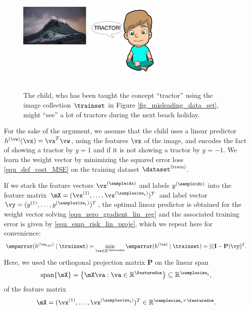 \documentclass[12pt]{report}
\begin{document}
\begin{figure}[htbp]
	\centering
	\includegraphics[width=0.7\textwidth]{OverfittingSample.jpg}   
	\caption{The child, who has been taught the concept ``tractor'' using the image collection 
		$\trainset$ in Figure \ref{fig_misleading_data_set}, might ``see'' a lot of tractors during the next beach holiday.}
	\label{equ_wave_as_tractor}   
\end{figure}


For the sake of the argument, we assume that the child uses a linear predictor 
$h^{(\vw)}(\vx) = \vx^{T} \vw$, using the features $\vx$ of the image, and encodes 
the fact of showing a tractor by $y=1$ and if it is not showing a tractor by $y=-1$. 
We learn the weight vector by minimizing the squared error loss \eqref{equ_def_cost_MSE} 
on the training dataset $\dataset^{(\rm train)}$.

If we stack the feature vectors $\vx^{(\sampleidx)}$ and labels $y^{(\sampleidx)}$ into 
the feature matrix $\mX=(\vx^{(1)},\ldots,\vx^{(\samplesize_{\rm t})})^{T}$ and label 
vector $\vy=(y^{(1)},\ldots,y^{(\samplesize_{\rm t})})^{T}$, the optimal linear predictor 
is obtained for the weight vector solving \eqref{equ_zero_gradient_lin_reg} 
and the associated training error is given by \eqref{equ_emp_risk_lin_proje}, which 
we repeat here for convenience: 
\begin{equation}
\emperror(h^{(\vw_{\rm opt})} \mid \trainset) = \min_{\vw \in \mathbb{R}^{\featuredim}} \emperror(h^{(\vw)} \mid \trainset) = \|  (\mathbf{I}- \mathbf{P}) \vy \|^{2}.
\end{equation} 
Here, we used the orthogonal projection matrix $\mathbf{P}$ on the linear span 
\begin{equation} 
\nonumber
{\rm span}\{ \mX \} = \big\{  \mX \va : \va \in \mathbb{R}^{\featuredim} \big\} \subseteq \mathbb{R}^{\samplesize_{\rm t}} , 
\end{equation}
of the feature matrix 
\begin{equation} 
\label{equ_feature_matrix_overfit}
\mX = (\vx^{(1)},\ldots,\vx^{(\samplesize_{\rm t})})^{T} \in \mathbb{R}^{  \samplesize_{\rm t} \times \featuredim}. 
\end{equation} 
\end{document}
